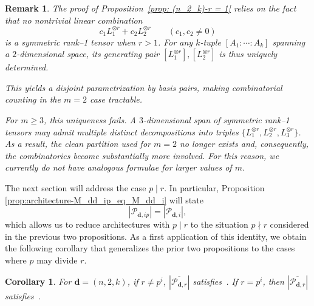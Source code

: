 \documentclass[a4paper]{cas-sc}
\newcommand{\dd}{\mathbf{d}}    %
\newtheorem{corollary}{Corollary}[theorem]
\newtheorem{remark}[theorem]{Remark}
\begin{document}
\begin{remark}
    The proof of Proposition~\ref{prop: (n_2_k)-r = 1} relies on the fact that no nontrivial linear combination
    \[
    c_1 L_1^{\otimes r} + c_2 L_2^{\otimes r} \qquad (c_1,c_2 \neq 0)
    \]
    is a symmetric rank–1 tensor when \(r>1\). For any \(k\)-tuple \(\left[A_1:\cdots:A_k\right]\) spanning a \(2\)-dimensional space, its generating pair
    \(
    \left[L_1^{\otimes r}\right], \left[L_2^{\otimes r}\right]
    \)
    is thus uniquely determined.
    
    This yields a disjoint parametrization by basis pairs, making combinatorial 
    counting in the \(m=2\) case tractable.
    
    For \(m \ge 3\), this uniqueness fails.  
    A \(3\)-dimensional span of symmetric rank–1 tensors may admit multiple distinct 
    decompositions into triples 
    \(\{L_1^{\otimes r}, L_2^{\otimes r}, L_3^{\otimes r}\}\). 
    As a result, the clean partition used for \(m=2\) no longer exists and, consequently, the combinatorics become substantially more involved. For this reason, we currently do not have analogous formulae for larger values of $m$.
\end{remark}
The next section will address the case $p \mid r$. In particular, Proposition \ref{prop:architecture-M_dd_ip_eq_M_dd_i} will state
\begin{equation} \label{eq: reduction}
    |\mathcal{P}_{\dd, ip}| = |\mathcal{P}_{\dd, i}|,
\end{equation}
which allows us to reduce architectures with $p \mid r$ to the situation $p \nmid r$ considered in the previous two propositions. As a first application of this identity, we obtain the following corollary that generalizes the prior two propositions to the cases where $p$ may divide $r$.
\begin{corollary} \label{lem: dd_n_2_k}
    For $\dd = (n,2,k)$, if $r \neq p^i$, $\left|\overline{\mathcal{P}_{\dd, r}}\right|$ satisfies~. If $r = p^i$, then $\left|\overline{\mathcal{P}_{\dd, r}}\right|$ satisfies~.
\end{corollary}
\end{document}
